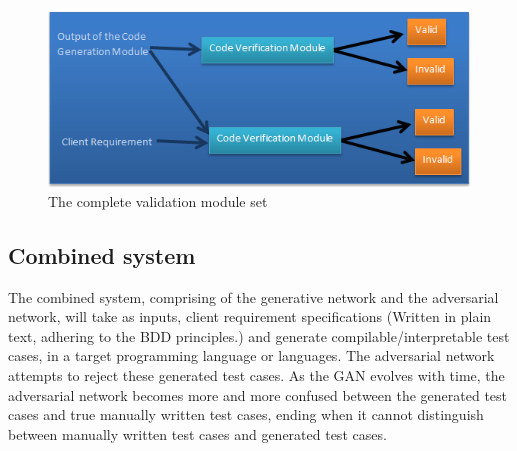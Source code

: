 \documentclass[conference]{IEEEtran}
\begin{document}
\begin{figure}
	\includegraphics[width=\linewidth]{Complete_verification_module.png}
	\caption{The complete validation module set}
	\label{fig9}
\end{figure}

\subsection{Combined system} 
The combined system, comprising of the generative network and the adversarial network,  will take as inputs, client requirement specifications (Written in plain text, adhering to the BDD principles.) and generate compilable/interpretable test cases, in a target programming language or languages. The adversarial network attempts to reject these generated test cases. As the GAN evolves with time, the adversarial network becomes more and more confused between the generated test cases and true manually written test cases, ending when it cannot distinguish between manually written test cases and generated test cases.
\end{document}
